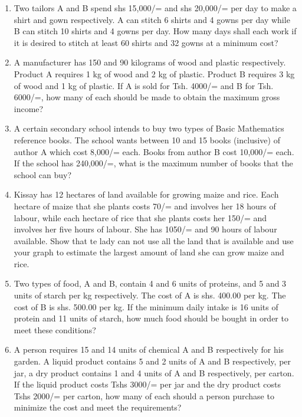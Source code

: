 \begin{enumerate}
	\item Two tailors A and B spend shs 15,000/= and shs 20,000/= per day to make a shirt and gown respectively. A can stitch 6 shirts and 4 gowns per day while B can stitch 10 shirts and 4 gowns per day. How many days shall each work if it is desired to stitch at least 60 shirts and 32 gowns at a minimum cost?
	
	\item A manufacturer has 150 and 90 kilograms of wood and plastic respectively. Product A requires 1 kg of wood and 2 kg of plastic. Product B requires 3 kg of wood and 1 kg of plastic. If A is sold for Tsh. 4000/= and B for Tsh. 6000/=, how many of each should be made to obtain the maximum gross income?
	
	\item A certain secondary school intends to buy two types of Basic Mathematics reference books. The school wants between 10 and 15 books (inclusive) of author A which cost 8,000/= each. Books from author B cost 10,000/= each. If the school has 240,000/=, what is the maximum number of books that the school can buy?
	
	\item Kissay has 12 hectares of land available for growing maize and rice. Each hectare of maize that she plants costs 70/= and involves her 18 hours of labour, while each hectare of rice that she plants costs her 150/= and involves her five hours of labour. She has 1050/= and 90 hours of labour available. Show that te lady can not use all the land that is available and use your graph to estimate the largest amount of land she can grow maize and rice.
	
	\item Two types of food, A and B, contain 4 and 6 units of proteins, and 5 and 3 units of starch per kg respectively. The cost of A is shs. 400.00 per kg. The cost of B is shs. 500.00 per kg. If the minimum daily intake is 16 units of protein and 11 units of starch, how much food should be bought in order to meet these conditions?
	
	\item A person requires 15 and 14 units of chemical A and B respectively for his garden. A liquid product contains 5 and 2 units of A and B respectively, per jar, a dry product contains 1 and 4 units of A and B respectively, per carton. If the liquid product costs Tshs 3000/= per jar and the dry product costs Tshs 2000/= per carton, how many of each should a person purchase to minimize the cost and meet the requirements?
	

\end{enumerate}
